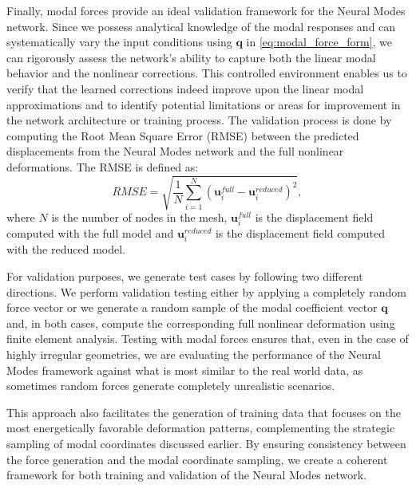 Finally, modal forces provide an ideal validation framework for the Neural Modes network. Since we possess analytical knowledge of the modal responses and can systematically vary the input conditions using $\bm{q}$ in \eqref{eq:modal_force_form}, we can rigorously assess the network's ability to capture both the linear modal behavior and the nonlinear corrections. This controlled environment enables us to verify that the learned corrections indeed improve upon the linear modal approximations and to identify potential limitations or areas for improvement in the network architecture or training process. The validation process is done by computing the Root Mean Square Error (RMSE) between the predicted displacements from the Neural Modes network and the full nonlinear deformations. The RMSE is defined as:
\begin{equation}
    RMSE = \sqrt{\frac{1}{N}\sum_{i=1}^N (\bm{u}_i^{full} - \bm{u}_i^{reduced})^2},
    \label{eq:rmse}
\end{equation}
where $N$ is the number of nodes in the mesh, $\bm{u}_i^{full}$ is the displacement field computed with the full model and $\bm{u}_i^{reduced}$ is the displacement field computed with the reduced model.

For validation purposes, we generate test cases by following two different directions. We perform validation testing either by applying a completely random force vector or we generate a random sample of the modal coefficient vector $\bm{q}$ and, in both cases, compute the corresponding full nonlinear deformation using finite element analysis.
Testing with modal forces ensures that, even in the case of highly irregular geometries, we are evaluating the performance of the Neural Modes framework against what is most similar to the real world data, as sometimes random forces generate completely unrealistic scenarios.

This approach also facilitates the generation of training data that focuses on the most energetically favorable deformation patterns, complementing the strategic sampling of modal coordinates discussed earlier. By ensuring consistency between the force generation and the modal coordinate sampling, we create a coherent framework for both training and validation of the Neural Modes network.

